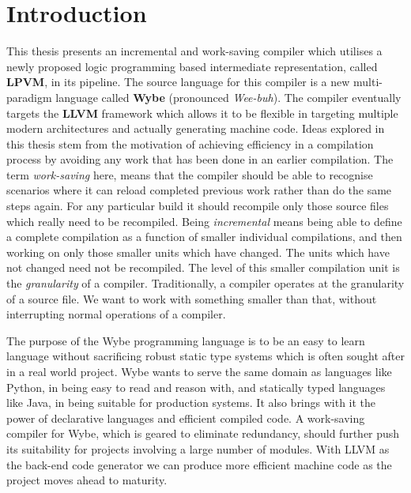 \chapter{Introduction}

This thesis presents an incremental and work-saving compiler which utilises a
newly proposed logic programming based intermediate representation, called
\textbf{LPVM}, in its pipeline. The source language for this
compiler is a new multi-paradigm language called \textbf{Wybe} (pronounced
\textit{Wee-buh}). The compiler eventually targets the \textbf{LLVM} framework
which allows it to be flexible in targeting multiple modern architectures and
actually generating machine code. Ideas explored in this thesis stem from the
motivation of achieving efficiency in a compilation process by avoiding any
work that has been done in an earlier compilation. The term
\textit{work-saving} here, means that the compiler should be able to recognise
scenarios where it can reload completed previous work rather than do the same
steps again. For any particular build it should recompile only those source
files which really need to be recompiled. Being \textit{incremental} means
being able to define a complete compilation as a function of smaller individual
compilations, and then working on only those smaller units which have
changed. The units which have not changed need not be recompiled. The level of
this smaller compilation unit is the \textit{granularity} of a
compiler. Traditionally, a compiler operates at the granularity of a source
file. We want to work with something smaller than that, without interrupting
normal operations of a compiler.

The purpose of the Wybe programming language is to be an easy to learn language
without sacrificing robust static type systems which is often sought after in a
real world project. Wybe wants to serve the same domain as languages like
Python, in being easy to read and reason with, and statically typed languages
like Java, in being suitable for production systems. It also brings with it the
power of declarative languages and efficient compiled code. A work-saving
compiler for Wybe, which is geared to eliminate redundancy, should further push
its suitability for projects involving a large number of modules. With LLVM as
the back-end code generator we can produce more efficient machine code as the
project moves ahead to maturity.


